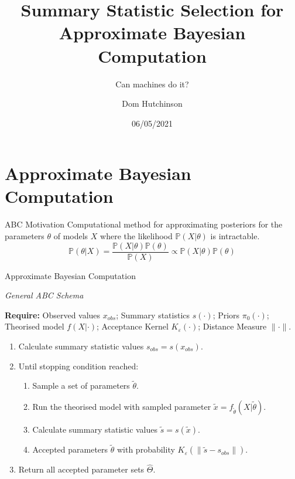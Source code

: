 \documentclass[aspectratio=169]{beamer}
\title[Short Title]{Summary Statistic Selection for Approximate Bayesian Computation}
\subtitle{Can machines do it?}
\author{Dom Hutchinson}
\date{06/05/2021}
\begin{document}



\begin{frame}[leftcolor=CoolGrey,rightcolor=UniversityRed,div=0.85\paperwidth]
  \titlepage
\end{frame}

\section{Approximate Bayesian Computation}

\begin{frame}{ABC Motivation}
  Computational method for approximating posteriors for the parameters $\theta$ of models $X$ where the likelihood $\mathbb{P}(X|\theta)$ is intractable.
  \[ \mathbb{P}(\theta|X)=\frac{\mathbb{P}(X|\theta)\mathbb{P}(\theta)}{\mathbb{P}(X)}\propto\mathbb{P}(X|\theta)\mathbb{P}(\theta) \]
\end{frame}

\begin{frame}{Approximate Bayesian Computation}
  \par \textit{General ABC Schema}
  \par\textbf{Require:} Observed values $x_{obs}$; Summary statistics $s(\cdot)$; Priors $\pi_0(\cdot)$; Theorised model $f(X|\cdot)$; Acceptance Kernel $K_\varepsilon(\cdot)$; Distance Measure $\|\cdot\|$.
  \begin{enumerate}
    \item Calculate summary statistic values $s_{obs}=s(x_{obs})$.
    \item Until stopping condition reached:
    \begin{enumerate}
      \item Sample a set of parameters $\tilde\theta$.
      \item Run the theorised model with sampled parameter $\tilde{x}=f_{\tilde\theta}(X|\tilde\theta)$.
      \item Calculate summary statistic values $\tilde{s}=s(\tilde{x})$.
      \item Accepted parameters $\tilde\theta$ with probability $K_\varepsilon(\|\tilde{s}-s_{obs}\|)$.
    \end{enumerate}
    \item Return all accepted parameter sets $\hat\Theta$.
  \end{enumerate}
\end{frame}
\end{document}
